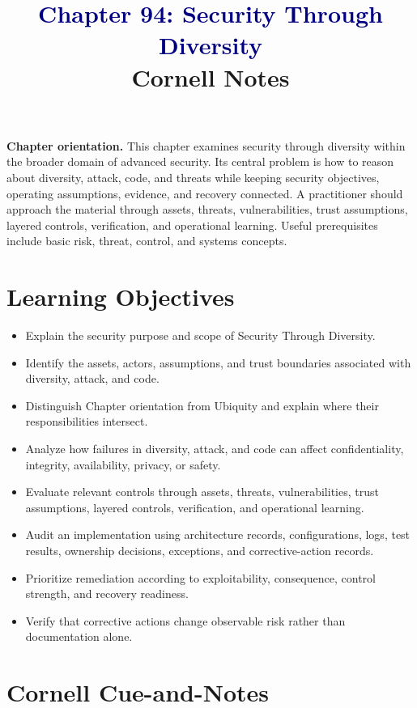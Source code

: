 \documentclass[11pt]{article}
\title{\textcolor{Navy}{Chapter 94: Security Through Diversity}\\[2mm]\large Cornell Notes}
\author{}
\date{}
\begin{document}
\maketitle
\thispagestyle{fancy}
\vspace{-1.5em}
\begin{orientationbox}
\textbf{Chapter orientation.} This chapter examines security through diversity within the broader domain of advanced security. Its central problem is how to reason about diversity, attack, code, and threats while keeping security objectives, operating assumptions, evidence, and recovery connected. A practitioner should approach the material through assets, threats, vulnerabilities, trust assumptions, layered controls, verification, and operational learning. Useful prerequisites include basic risk, threat, control, and systems concepts.
\end{orientationbox}
\section*{Learning Objectives}
\begin{itemize}
\item Explain the security purpose and scope of Security Through Diversity.
\item Identify the assets, actors, assumptions, and trust boundaries associated with diversity, attack, and code.
\item Distinguish Chapter orientation from Ubiquity and explain where their responsibilities intersect.
\item Analyze how failures in diversity, attack, and code can affect confidentiality, integrity, availability, privacy, or safety.
\item Evaluate relevant controls through assets, threats, vulnerabilities, trust assumptions, layered controls, verification, and operational learning.
\item Audit an implementation using architecture records, configurations, logs, test results, ownership decisions, exceptions, and corrective-action records.
\item Prioritize remediation according to exploitability, consequence, control strength, and recovery readiness.
\item Verify that corrective actions change observable risk rather than documentation alone.
\end{itemize}
\section*{Cornell Cue-and-Notes}
\end{document}
